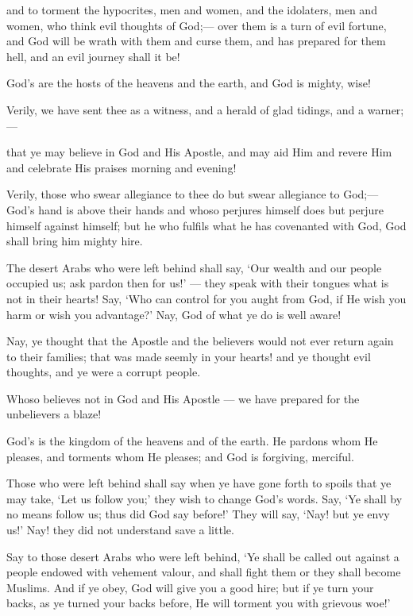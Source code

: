 \documentclass[fontsize=14pt, letterpaper, notitlepage, openany, DIV=12]{scrbook} %
\begin{document}
\noindent[48:6]
and to torment the hypocrites, men and women, and the idolaters, men and women, who
think evil thoughts of God;--- over them is a turn of evil fortune, and God will be wrath with
them and curse them, and has prepared for them hell, and an evil journey shall it be!

\noindent[48:7]
God's are the hosts of the heavens and the earth, and God is mighty, wise!

\noindent[48:8]
Verily, we have sent thee as a witness, and a herald of glad tidings, and a warner;---

\noindent[48:9]
that ye may believe in God and His Apostle, and may aid Him and revere Him and
celebrate His praises morning and evening!

\noindent[48:10]
Verily, those who swear allegiance to thee do but swear allegiance to God;--- God's hand
is above their hands and whoso perjures himself does but perjure himself against himself; but he
who fulfils what he has covenanted with God, God shall bring him mighty hire.

\noindent[48:11]
The desert Arabs who were left behind shall say, `Our wealth and our people occupied
us; ask pardon then for us!' --- they speak with their tongues what is not in their hearts! Say,
`Who can control for you aught from God, if He wish you harm or wish you advantage?' Nay,
God of what ye do is well aware!

\noindent[48:12]
Nay, ye thought that the Apostle and the believers would not ever return again to their
families; that was made seemly in your hearts! and ye thought evil thoughts, and ye were a
corrupt people.

\noindent[48:13]
Whoso believes not in God and His Apostle --- we have prepared for the unbelievers a
blaze!

\noindent[48:14]
God's is the kingdom of the heavens and of the earth. He pardons whom He pleases, and
torments whom He pleases; and God is forgiving, merciful.

\noindent[48:15]
Those who were left behind shall say when ye have gone forth to spoils that ye may take,
`Let us follow you;' they wish to change God's words. Say, `Ye shall by no means follow us;
thus did God say before!' They will say, `Nay! but ye envy us!' Nay! they did not understand
save a little.

\noindent[48:16]
Say to those desert Arabs who were left behind, `Ye shall be called out against a people
endowed with vehement valour, and shall fight them or they shall become Muslims. And if ye
obey, God will give you a good hire; but if ye turn your backs, as ye turned your backs before,
He will torment you with grievous woe!'
\end{document}
